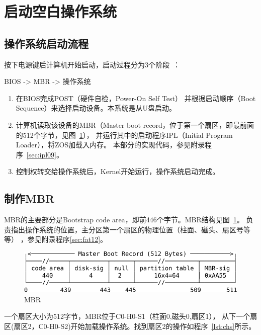 \section{启动空白操作系统}

\subsection{操作系统启动流程}

按下电源键后计算机开始启动，启动过程分为3个阶段~\cite{阮一峰2014如何变得有思想}：
\begin{center}BIOS -> MBR -> 操作系统\end{center}

\begin{enumerate}
\item 在BIOS完成POST（硬件自检，Power-On Self Test）
  并根据启动顺序（Boot Sequence）来选择启动设备。本系统是从U盘启动。
\item 计算机读取该设备的MBR（Master boot record，位于第一个扇区，即最前面的512个字节，见图~\ref{fig:mbr}），
  并运行其中的启动程序IPL（Initial Program Loader），将ZOS加载入内存。
  本部分的实现代码，参见附录程序~\ref{sec:ipl09}。
\item 控制权转交给操作系统后，Kernel开始运行，操作系统启动完成。
\end{enumerate}

\subsection{制作MBR}

MBR的主要部分是Bootstrap code area，即前446个字节。MBR结构见图~\ref{fig:mbr}。
负责指出操作系统的位置，主分区第一个扇区的物理位置（柱面、磁头、扇区号等等）
，参见附录程序\ref{sec:fat12}。

\begin{figure}[H]
  \centering
  \includegraphics[width=1\textwidth]{fig/mbr.pdf}
  \caption{MBR}
  \label{fig:mbr}
\end{figure}

一个扇区大小为512字节，MBR位于C0-H0-S1（柱面0,磁头0,扇区1），\cite{刘伟2010数据恢复技术深度揭秘}
从下一个扇区(扇区2，C0-H0-S2)开始加载操作系统。找到扇区2的操作如程序~\ref{lst:chs}所示。


